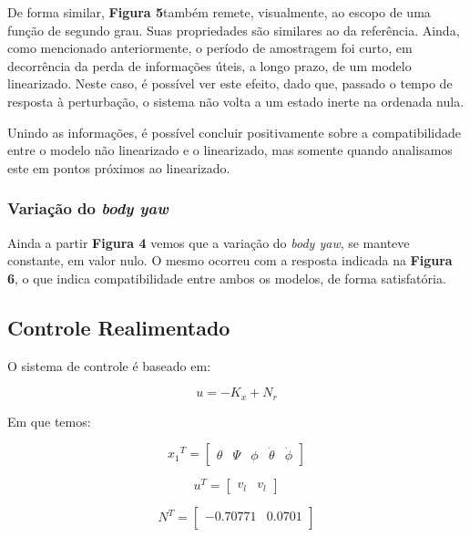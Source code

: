 \documentclass[12pt]{article}
\begin{document}
\par De forma similar, \textbf{Figura 5}também
remete, visualmente, ao escopo de uma função de segundo grau. Suas
propriedades são similares ao da referência. Ainda, como mencionado
anteriormente, o período de amostragem foi curto, em decorrência da perda
de informações úteis, a longo prazo, de um modelo linearizado. Neste caso, é
possível ver este efeito, dado que, passado o tempo de resposta à perturbação,
o sistema não volta a um estado inerte na ordenada nula.

\par Unindo as informações, é possível concluir positivamente sobre a
compatibilidade entre o modelo não linearizado e o linearizado, mas somente
quando analisamos este em pontos próximos ao linearizado. 

\subsubsection{Variação do \emph{body yaw}}

\quad Ainda a partir \textbf{Figura 4} vemos que a
variação do \emph{body yaw}, se manteve constante, em valor nulo. O mesmo ocorreu
com a resposta indicada na \textbf{Figura 6}, o que indica compatibilidade entre ambos
os modelos, de forma satisfatória.

\subsection{Controle Realimentado}

\quad O sistema de controle é baseado em:

\begin{equation}
    u = -K_x + N_r
\end{equation}

Em que temos:

\begin{equation}
    {x_1}^T = \begin{bmatrix}
    \theta & \Psi & \phi & \dot{\theta} & \dot{\phi} 
    \end{bmatrix}
\end{equation}

\begin{equation}
    u^T = \begin{bmatrix}
    v_l & v_l
    \end{bmatrix}
\end{equation}

\begin{equation}
    N^T = \begin{bmatrix}
    -0.70771 & 0.0701\\
    \end{bmatrix}
\end{equation}
\end{document}
